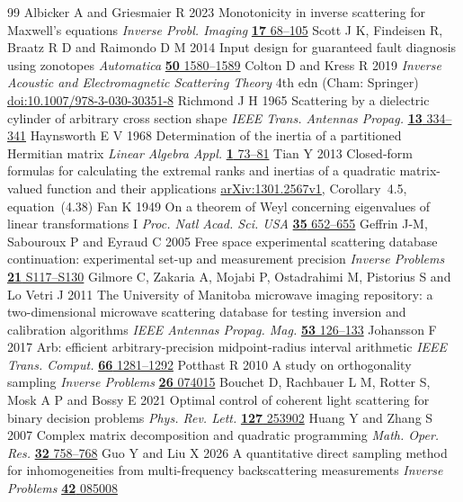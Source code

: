 \begin{thebibliography}{99}
 Albicker A and Griesmaier R 2023 Monotonicity in inverse scattering for Maxwell's equations \emph{Inverse Probl. Imaging} \href{https://doi.org/10.3934/ipi.2022032}{\textbf{17} 68--105}
 Scott J K, Findeisen R, Braatz R D and Raimondo D M 2014 Input design for guaranteed fault diagnosis using zonotopes \emph{Automatica} \href{https://doi.org/10.1016/j.automatica.2014.03.016}{\textbf{50} 1580--1589}
 Colton D and Kress R 2019 \emph{Inverse Acoustic and Electromagnetic Scattering Theory} 4th edn (Cham: Springer) \href{https://doi.org/10.1007/978-3-030-30351-8}{doi:10.1007/978-3-030-30351-8}
 Richmond J H 1965 Scattering by a dielectric cylinder of arbitrary cross section shape \emph{IEEE Trans. Antennas Propag.} \href{https://doi.org/10.1109/TAP.1965.1138427}{\textbf{13} 334--341}
 Haynsworth E V 1968 Determination of the inertia of a partitioned Hermitian matrix \emph{Linear Algebra Appl.} \href{https://doi.org/10.1016/0024-3795(68)90050-5}{\textbf{1} 73--81}
 Tian Y 2013 Closed-form formulas for calculating the extremal ranks and inertias of a quadratic matrix-valued function and their applications \href{https://arxiv.org/abs/1301.2567v1}{arXiv:1301.2567v1}, Corollary~4.5, equation~(4.38)
 Fan K 1949 On a theorem of Weyl concerning eigenvalues of linear transformations I \emph{Proc. Natl Acad. Sci. USA} \href{https://doi.org/10.1073/pnas.35.11.652}{\textbf{35} 652--655}
 Geffrin J-M, Sabouroux P and Eyraud C 2005 Free space experimental scattering database continuation: experimental set-up and measurement precision \emph{Inverse Problems} \href{https://doi.org/10.1088/0266-5611/21/6/S09}{\textbf{21} S117--S130}
 Gilmore C, Zakaria A, Mojabi P, Ostadrahimi M, Pistorius S and Lo Vetri J 2011 The University of Manitoba microwave imaging repository: a two-dimensional microwave scattering database for testing inversion and calibration algorithms \emph{IEEE Antennas Propag. Mag.} \href{https://doi.org/10.1109/MAP.2011.6138442}{\textbf{53} 126--133}
 Johansson F 2017 Arb: efficient arbitrary-precision midpoint-radius interval arithmetic \emph{IEEE Trans. Comput.} \href{https://doi.org/10.1109/TC.2017.2690633}{\textbf{66} 1281--1292}
 Potthast R 2010 A study on orthogonality sampling \emph{Inverse Problems} \href{https://doi.org/10.1088/0266-5611/26/7/074015}{\textbf{26} 074015}
 Bouchet D, Rachbauer L M, Rotter S, Mosk A P and Bossy E 2021 Optimal control of coherent light scattering for binary decision problems \emph{Phys. Rev. Lett.} \href{https://doi.org/10.1103/PhysRevLett.127.253902}{\textbf{127} 253902}
 Huang Y and Zhang S 2007 Complex matrix decomposition and quadratic programming \emph{Math. Oper. Res.} \href{https://doi.org/10.1287/moor.1070.0268}{\textbf{32} 758--768}
 Guo Y and Liu X 2026 A quantitative direct sampling method for inhomogeneities from multi-frequency backscattering measurements \emph{Inverse Problems} \href{https://doi.org/10.1088/1361-6420/ae963b}{\textbf{42} 085008}
\end{thebibliography}

